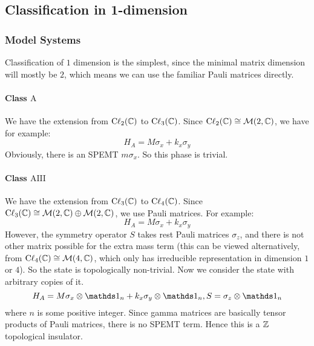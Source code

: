 \documentclass{article}
\begin{document}
\subsection{Classification in 1-dimension}
\label{sec:Classification in 1-dimension}

\subsubsection{Model Systems}
\label{sec:Model Systems}
Classification of $1$ dimension is the simplest, since the minimal matrix
dimension will mostly be $2$, which means we can use the familiar Pauli matrices
directly.

\paragraph{Class $\mathrm{A}$} We have the extension from
$\mathrm{C\ell}_{2}(\mathbb{C})$ to $\mathrm{C\ell}_{3}(\mathbb{C})$. Since
$\mathrm{C\ell}_{2}(\mathbb{C})\cong\mathcal{M}(2,\mathbb{C})$, we have for example:
\begin{equation}
    H_A = M \sigma_x + k_x \sigma_y
\end{equation}
Obviously, there is an SPEMT $m\sigma_x$. So this phase is trivial.

\paragraph{Class $\mathrm{AIII}$} We have the extension from
$\mathrm{C\ell}_{3}(\mathbb{C})$ to $\mathrm{C\ell}_{4}(\mathbb{C})$. Since
$\mathrm{C\ell}_{3}(\mathbb{C})\cong \mathcal{M}(2,\mathbb{C})\oplus\mathcal{M}(2,\mathbb{C})$, we use
Pauli matrices. For example:
\begin{equation}
    H_A = M \sigma_x + k_x \sigma_y
\end{equation}
However, the symmetry operator $S$ takes rest Pauli matrices $\sigma_z$, and
there is not other matrix possible for the extra mass term (this can be viewed
alternatively, from $\mathrm{C\ell}_{4}(\mathbb{C})\cong \mathcal{M}(4,\mathbb{C})$, which only
has irreducible representation in dimension $1$ or $4$). So the state is
topologically non-trivial. Now we consider the state with arbitrary copies of it.
\begin{equation}
    H_A = M \sigma_x\otimes \id_n + k_x\sigma_y\otimes\id_n,
    S=\sigma_z\otimes\id_n
\end{equation}
where $n$ is some positive integer. Since gamma matrices are basically tensor
products of Pauli matrices, there is no SPEMT term. Hence this is a $\mathbb{Z}$
topological insulator.
\end{document}
